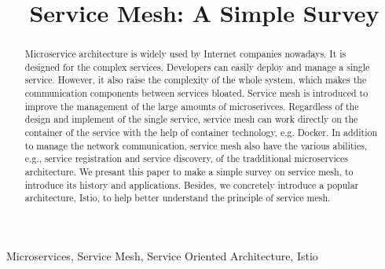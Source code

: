 \documentclass[conference]{IEEEtran}
\begin{document}
\title{Service Mesh: A Simple Survey}

\maketitle

\begin{abstract}
Microservice architecture is widely used by Internet companies nowadays.
It is designed for the complex services.
Developers can easily deploy and manage a single service.
However, it also raise the complexity of the whole system, which makes the communication components between services bloated.
Service mesh is introduced to improve the management of the large amounts of microserivces.
Regardless of the design and implement of the single service, service mesh can work directly on the container of the service with the help of container technology, e.g. Docker.
In addition to manage the network communication, service mesh also have the various abilities, e.g., service registration and service discovery, of the tradditional microservices architecture.
We presant this paper to make a simple survey on service mesh, to introduce its history and applications.
Besides, we concretely introduce a popular architecture, Istio, to help better understand the principle of service mesh.
\cite{li2019service}
\end{abstract}

\begin{IEEEkeywords}
  Microservices, Service Mesh, Service Oriented Architecture, Istio
\end{IEEEkeywords}
\end{document}
